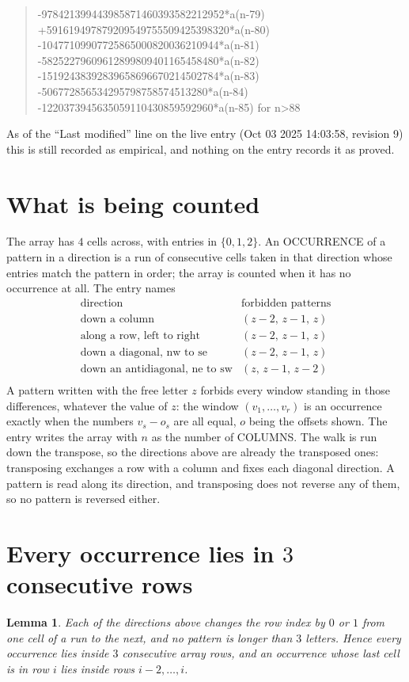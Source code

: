 \documentclass[11pt,a4paper]{article}
\theoremstyle{plain}
\newtheorem{lemma}[theorem]{Lemma}
\theoremstyle{definition}
\begin{document}
\begin{quote}
-978421399443985871460393582212952*a(n-79) +591619497879209549755509425398320*a(n-80) -10477109907725865000820036210944*a(n-81) -58252279609612899809401165458480*a(n-82) -15192438392839658696670214502784*a(n-83) -506772856534295798758574513280*a(n-84) -1220373945635059110430859592960*a(n-85) for n>88
\end{quote}
As of the ``Last modified'' line on the live entry (Oct 03 2025 14:03:58, revision 9) this is still
recorded as empirical, and nothing on the entry records it as proved.

\section{What is being counted}

The array has $4$ cells across, with entries in $\{0,1,2\}$. An OCCURRENCE of a pattern in a
direction is a run of consecutive cells taken in that direction whose entries match the pattern
in order; the array is counted when it has no occurrence at all. The entry names
\[
\begin{array}{ll}
\text{direction} & \text{forbidden patterns} \\[2pt]
\text{down a column} & (z-2,\,z-1,\,z) \\
\text{along a row, left to right} & (z-2,\,z-1,\,z) \\
\text{down a diagonal, nw to se} & (z-2,\,z-1,\,z) \\
\text{down an antidiagonal, ne to sw} & (z,\,z-1,\,z-2) \\
\end{array}
\]
 A pattern written with the free letter $z$ forbids every window standing in those differences, whatever the value of $z$: the window $(v_1,\dots,v_r)$ is an occurrence exactly when the numbers $v_s-o_s$ are all equal, $o$ being the offsets shown. The entry writes the array with $n$ as the number of COLUMNS. The walk is run down the transpose, so the directions above are already the transposed ones: transposing exchanges a row with a column and fixes each diagonal direction. A pattern is read along its direction, and transposing does not reverse any of them, so no pattern is reversed either.

\section{Every occurrence lies in $3$ consecutive rows}

\begin{lemma}\label{lem:win}
Each of the directions above changes the row index by $0$ or $1$ from one cell of a run to the
next, and no pattern is longer than $3$ letters. Hence every occurrence lies inside $3$
consecutive array rows, and an occurrence whose last cell is in row $i$ lies inside rows
$i-2,\dots,i$.
\end{lemma}
\end{document}
